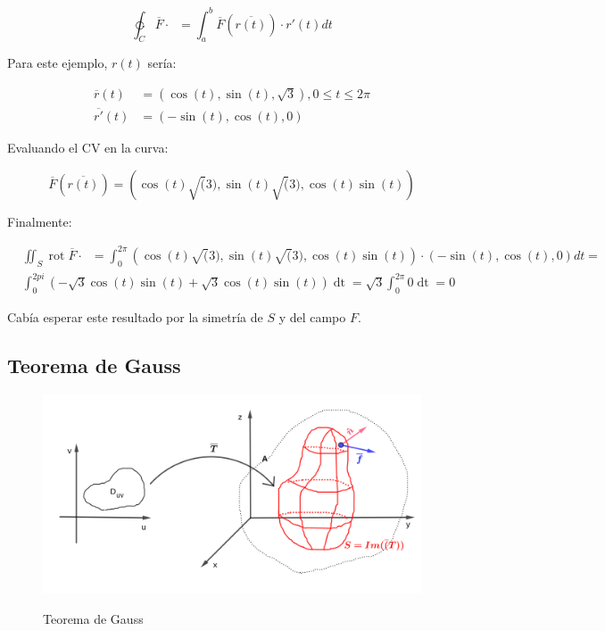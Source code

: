 \documentclass{article}
\begin{document}
\begin{enumerate}
\begin{equation}
\ointctrclockwise_C \overline{F} \cdot \mathop{\overline{dC}} = \int_a^b \overline{F}(\overline{r(t)}) \cdot r'(t) dt
\end{equation}

Para este ejemplo, $r(t)$ sería:

\begin{align}
\overline{r}(t) &= \left( \cos (t), \sin (t), \sqrt{3} \right), 0 \leq t \leq 2\pi \\
\overline{r'}(t) &= \left( -\sin (t), \cos (t), 0 \right)
\end{align}

Evaluando el CV en la curva:

\begin{equation}
\overline{F}(\overline{r(t)}) = \left( \cos(t) \sqrt(3), \sin(t) \sqrt(3), \cos(t) \sin(t) \right)
\end{equation}

Finalmente:

\begin{align}
& \iint_S \mathop{rot}\overline{F} \cdot \mathop{\overline{dS}} = \int_0^{2\pi} \left( \cos(t) \sqrt(3), \sin(t) \sqrt(3), \cos(t) \sin(t) \right) \cdot \left( -\sin (t), \cos (t), 0 \right) dt = \\
& \int_0^{2pi} \left( -\sqrt{3} \cos(t) \sin(t) + \sqrt{3} \cos(t) \sin(t) \right) \mathop{dt} = \sqrt{3} \int_0^{2\pi} 0 \mathop{dt} = 0
\end{align}

Cabía esperar este resultado por la simetría de $S$ y del campo $F$.

\end{enumerate}

\subsection{Teorema de Gauss}

\begin{figure}[ht]
\centering
\caption{Teorema de Gauss}
\includegraphics[scale=0.7]{img/teoremas/gauss.png}
\label{fig:gauss}
\end{figure}
\end{document}
